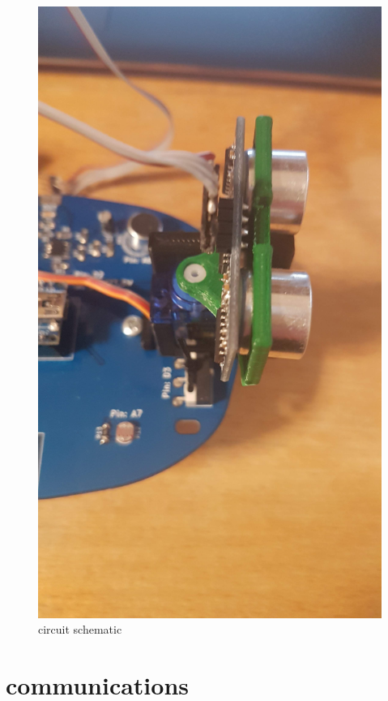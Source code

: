 \begin{figure}[h]%
	\label{fig:fullmount}
	\begin{center}
	\includegraphics[width = 1\textwidth]{"assets/fullmount"}
	\caption{circuit schematic}
	\end{center}
\end{figure}

\section{communications}

